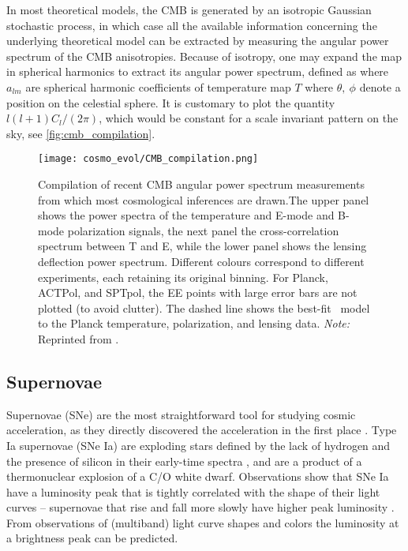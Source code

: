 In most theoretical models, the CMB is generated by an isotropic Gaussian stochastic process, in which case all the available information concerning the underlying theoretical model can be extracted by measuring the angular power spectrum of the CMB anisotropies. Because of isotropy, one may expand the map in spherical harmonics to extract its angular power spectrum, defined as \parencite{2015IJMPD..2430004B}
where $a_{lm}$ are spherical harmonic coefficients of temperature map $T$
where $\theta,\ \phi$  denote a position on the celestial sphere. It is customary to plot the quantity $l(l+1)C_l/(2\pi)$, which would be constant for a scale invariant pattern on the sky, see \autoref{fig:cmb_compilation}.
\begin{figure}[!hbt]
    \centering
    \texttt{[image: cosmo\_evol/CMB\_compilation.png]}
    \caption{Compilation of recent CMB angular power spectrum measurements from which most cosmological inferences are drawn.The upper panel shows the power spectra of the temperature and E-mode and B-mode polarization signals, the next panel the cross-correlation spectrum between T and E, while the lower panel shows the lensing deflection power spectrum. Different colours correspond to different experiments, each retaining its original binning. For Planck, ACTPol, and SPTpol, the EE points with large error bars are not plotted (to avoid clutter). The dashed line shows the best-fit \LCDM\ model to the Planck temperature, polarization, and lensing data. \textit{Note:} Reprinted from \textcite{2018arXiv180706205P}.}
    \label{fig:cmb_compilation}
\end{figure}
\subsection{Supernovae}
Supernovae (SNe) are the most straightforward tool for studying cosmic acceleration, as they directly discovered the acceleration in the first place \parencite{riess}. Type Ia supernovae (SNe Ia) are exploding stars defined by the lack of hydrogen and the presence of silicon in their early-time spectra \parencite{SN}, and are a product of a thermonuclear explosion of a C/O white dwarf. Observations show that SNe Ia have a luminosity peak that is tightly correlated with the shape of their light curves -- supernovae that rise and fall more slowly have higher peak luminosity \parencite[first quantified by][]{SN_lum}. From observations of (multiband) light curve shapes and colors the luminosity at a brightness peak can be predicted.

